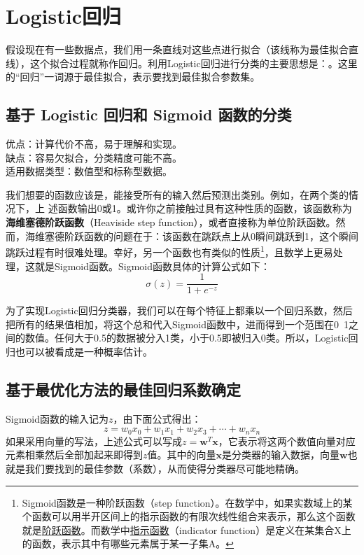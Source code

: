 \chapter{Logistic回归\label{chapter05}}
假设现在有一些数据点，我们用一条直线对这些点进行拟合（该线称为最佳拟合直线），这个拟合过程就称作回归。利用Logistic回归进行分类的主要思想是：。这里的“回归”一词源于最佳拟合，表示要找到最佳拟合参数集。

\section{基于 Logistic 回归和 Sigmoid 函数的分类}
\begin{tcolorbox}[title=Logistic回归]
    优点：计算代价不高，易于理解和实现。\\
    缺点：容易欠拟合，分类精度可能不高。\\
    适用数据类型：数值型和标称型数据。
\end{tcolorbox}

我们想要的函数应该是，能接受所有的输入然后预测出类别。例如，在两个类的情况下，上
述函数输出0或1。或许你之前接触过具有这种性质的函数，该函数称为\textbf{海维塞德阶跃函数}（Heaviside step function），或者直接称为单位阶跃函数。然而，海维塞德阶跃函数的问题在于：该函数在跳跃点上从0瞬间跳跃到1，这个瞬间跳跃过程有时很难处理。幸好，另一个函数也有类似的性质\footnote{Sigmoid函数是一种阶跃函数（step function）。在数学中，如果实数域上的某个函数可以用半开区间上的指示函数的有限次线性组合来表示，那么这个函数就是\href{https://en.wikipedia.org/wiki/Step_function}{阶跃函数}。而数学中\href{https://en.wikipedia.org/wiki/Indicator_function}{指示函数}（indicator function）是定义在某集合X上的函数，表示其中有哪些元素属于某一子集A。}，且数学上更易处理，这就是Sigmoid函数。Sigmoid函数具体的计算公式如下：
\begin{equation*}
    \sigma(z)=\frac{1}{1+e^{-z}}
\end{equation*}

为了实现Logistic回归分类器，我们可以在每个特征上都乘以一个回归系数，然后把所有的结果值相加，将这个总和代入Sigmoid函数中，进而得到一个范围在0~1之间的数值。任何大于0.5的数据被分入1类，小于0.5即被归入0类。所以，Logistic回归也可以被看成是一种概率估计。

\section{基于最优化方法的最佳回归系数确定}
Sigmoid函数的输入记为$z$，由下面公式得出：
\begin{equation*}
    z =w_0x_0+w_1x_1+w_2x_3+\cdots+w_nx_n
\end{equation*}
如果采用向量的写法，上述公式可以写成$z=\bm{w}^T\bm{x}$，它表示将这两个数值向量对应元素相乘然后全部加起来即得到$z$值。其中的向量$\bm{x}$是分类器的输入数据，向量$\bm{w}$也就是我们要找到的最佳参数（系数），从而使得分类器尽可能地精确。

